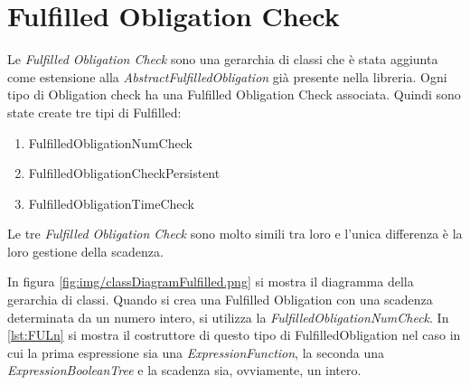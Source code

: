 \section{Fulfilled Obligation Check}
\label{sec:FulfilledObligationCheck}
Le \emph{Fulfilled Obligation Check} sono una gerarchia di classi che è stata aggiunta
come estensione alla \emph{AbstractFulfilledObligation} già presente nella libreria.
Ogni tipo di Obligation check ha una Fulfilled Obligation Check associata. Quindi sono state create
tre tipi di Fulfilled:
\begin{enumerate}
  \item FulfilledObligationNumCheck
  \item FulfilledObligationCheckPersistent
  \item FulfilledObligationTimeCheck
\end{enumerate}
Le tre \emph{Fulfilled Obligation Check} sono molto simili
tra loro e l'unica differenza è la loro gestione della scadenza.\par
In figura \ref{fig:img/classDiagramFulfilled.png} si mostra il diagramma della gerarchia di classi.
\clearpage
{}
\clearpage
Quando si crea una Fulfilled Obligation con una scadenza determinata da un numero intero, si utilizza
la \emph{FulfilledObligationNumCheck}. In \ref{lst:FULn} si mostra il costruttore di questo tipo di
FulfilledObligation nel caso in cui la prima espressione sia una \emph{ExpressionFunction}, la seconda
una \emph{ExpressionBooleanTree} e la scadenza sia, ovviamente, un intero.

